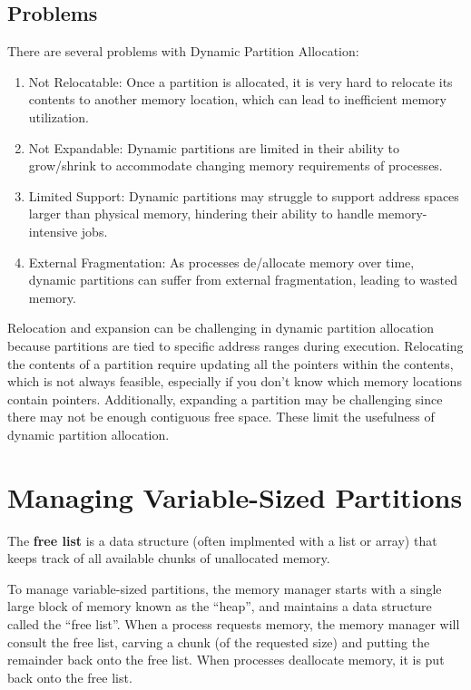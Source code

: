 \documentclass{report}
\newcommand{\definitionBegin}[1]{\begin{tcolorbox}[title={Definition: #1}]}
\newcommand{\definitionEnd}{\end{tcolorbox}}
\begin{document}
\subsection{Problems}
There are several problems with Dynamic Partition Allocation:
\begin{enumerate}[label=\textit{(\roman*)}]
\item Not Relocatable: Once a partition is allocated, it is very hard to relocate its contents to
  another memory location, which can lead to inefficient memory utilization.
\item Not Expandable: Dynamic partitions are limited in their ability to grow/shrink to
  accommodate changing memory requirements of processes.
\item Limited Support: Dynamic partitions may struggle to support address spaces larger than
  physical memory, hindering their ability to handle memory-intensive jobs.
\item External Fragmentation: As processes de/allocate memory over time, dynamic partitions can
  suffer from external fragmentation, leading to wasted memory.
\end{enumerate}
Relocation and expansion can be challenging in dynamic partition allocation because partitions
are tied to specific address ranges during execution. Relocating the contents of a partition require
updating all the pointers within the contents, which is not always feasible, especially if you don't
know which memory locations contain pointers. Additionally, expanding a partition may be challenging
since there may not be enough contiguous free space. These limit the usefulness of dynamic partition
allocation. 


\section*{Managing Variable-Sized Partitions}
\definitionBegin{Free List}
The \textbf{free list} is a data structure (often implmented with a list or array) that keeps track
of all available chunks of unallocated memory.
\definitionEnd

To manage variable-sized partitions, the memory manager starts with a single large block of memory
known as the ``heap'', and maintains a data structure called the ``free list''. When a process
requests memory, the memory manager will consult the free list, carving a chunk (of the requested
size) and putting the remainder back onto the free list. When processes deallocate memory, it is put
back onto the free list.
\end{document}

